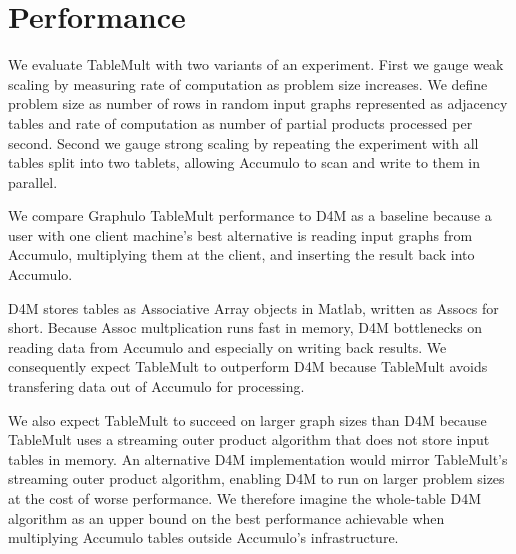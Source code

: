 
\section{Performance}
\label{sPerformance}

We evaluate TableMult with two variants of an experiment. 
First we gauge weak scaling by measuring rate of computation as problem size increases.
We define problem size as number of rows in random input graphs 
represented as adjacency tables
and rate of computation as number of partial products processed per second.
Second we gauge strong scaling by repeating the experiment with all tables split into two tablets,
allowing Accumulo to scan and write to them in parallel.



We compare Graphulo TableMult performance to D4M as a baseline because 
a user with one client machine's best alternative is reading input graphs from Accumulo, 
multiplying them at the client, and inserting the result back into Accumulo.

D4M stores tables as Associative Array objects in Matlab, written as Assocs for short.  
Because Assoc multplication runs fast in memory, 
D4M bottlenecks on reading data from Accumulo and especially on writing back results.
We consequently expect TableMult to outperform D4M 
because TableMult avoids transfering data out of Accumulo for processing. 

We also expect TableMult to succeed on larger graph sizes than D4M because TableMult
uses a streaming outer product algorithm that does not store input tables in memory.
An alternative D4M implementation would mirror TableMult's streaming outer product algorithm,
enabling D4M to run on larger problem sizes at the cost of worse performance.
We therefore imagine the whole-table D4M algorithm as an upper bound on the best performance 
achievable when multiplying Accumulo tables outside Accumulo's infrastructure.

